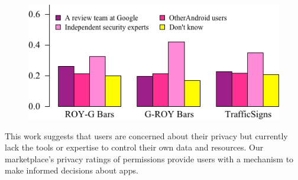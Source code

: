 \documentclass[11pt]{article}
\begin{document}
\begin{figure}[ht]
\centering
    \includegraphics[width=.5\linewidth]{graphs/SourceBeliefs.png}
    \label{src-beliefs}
\end{figure}

This work suggests that users are 
concerned about their privacy but currently lack the tools 
or expertise to control their own data and resources. Our 
marketplace's privacy ratings of permissions provide users
with a mechanism to make informed decisions about apps.
\end{document}
